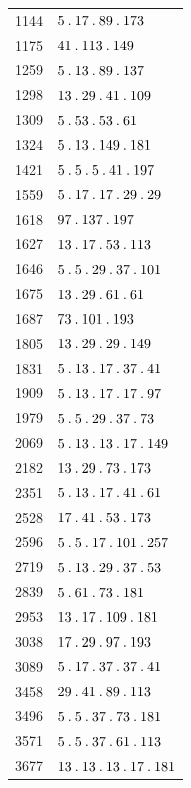 %
\begingroup\small\setlength{\tabcolsep}{5pt}
\begin{longtable}{@{}r|l@{}}
1144 & $5\mathbin{.} 17\mathbin{.} 89\mathbin{.} 173$\\
1175 & $41\mathbin{.} 113\mathbin{.} 149$\\
1259 & $5\mathbin{.} 13\mathbin{.} 89\mathbin{.} 137$\\
1298 & $13\mathbin{.} 29\mathbin{.} 41\mathbin{.} 109$\\
1309 & $5\mathbin{.} 53\mathbin{.} 53\mathbin{.} 61$\\
1324 & $5\mathbin{.} 13\mathbin{.} 149\mathbin{.} 181$\\
1421 & $5\mathbin{.} 5\mathbin{.} 5\mathbin{.} 41\mathbin{.} 197$\\
1559 & $5\mathbin{.} 17\mathbin{.} 17\mathbin{.} 29\mathbin{.} 29$\\
1618 & $97\mathbin{.} 137\mathbin{.} 197$\\
1627 & $13\mathbin{.} 17\mathbin{.} 53\mathbin{.} 113$\\
1646 & $5\mathbin{.} 5\mathbin{.} 29\mathbin{.} 37\mathbin{.} 101$\\
1675 & $13\mathbin{.} 29\mathbin{.} 61\mathbin{.} 61$\\
1687 & $73\mathbin{.} 101\mathbin{.} 193$\\
1805 & $13\mathbin{.} 29\mathbin{.} 29\mathbin{.} 149$\\
1831 & $5\mathbin{.} 13\mathbin{.} 17\mathbin{.} 37\mathbin{.} 41$\\
1909 & $5\mathbin{.} 13\mathbin{.} 17\mathbin{.} 17\mathbin{.} 97$\\
1979 & $5\mathbin{.} 5\mathbin{.} 29\mathbin{.} 37\mathbin{.} 73$\\
2069 & $5\mathbin{.} 13\mathbin{.} 13\mathbin{.} 17\mathbin{.} 149$\\
2182 & $13\mathbin{.} 29\mathbin{.} 73\mathbin{.} 173$\\
2351 & $5\mathbin{.} 13\mathbin{.} 17\mathbin{.} 41\mathbin{.} 61$\\
2528 & $17\mathbin{.} 41\mathbin{.} 53\mathbin{.} 173$\\
2596 & $5\mathbin{.} 5\mathbin{.} 17\mathbin{.} 101\mathbin{.} 257$\\
2719 & $5\mathbin{.} 13\mathbin{.} 29\mathbin{.} 37\mathbin{.} 53$\\
2839 & $5\mathbin{.} 61\mathbin{.} 73\mathbin{.} 181$\\
2953 & $13\mathbin{.} 17\mathbin{.} 109\mathbin{.} 181$\\
3038 & $17\mathbin{.} 29\mathbin{.} 97\mathbin{.} 193$\\
3089 & $5\mathbin{.} 17\mathbin{.} 37\mathbin{.} 37\mathbin{.} 41$\\
3458 & $29\mathbin{.} 41\mathbin{.} 89\mathbin{.} 113$\\
3496 & $5\mathbin{.} 5\mathbin{.} 37\mathbin{.} 73\mathbin{.} 181$\\
3571 & $5\mathbin{.} 5\mathbin{.} 37\mathbin{.} 61\mathbin{.} 113$\\
3677 & $13\mathbin{.} 13\mathbin{.} 13\mathbin{.} 17\mathbin{.} 181$\\

\end{longtable}

